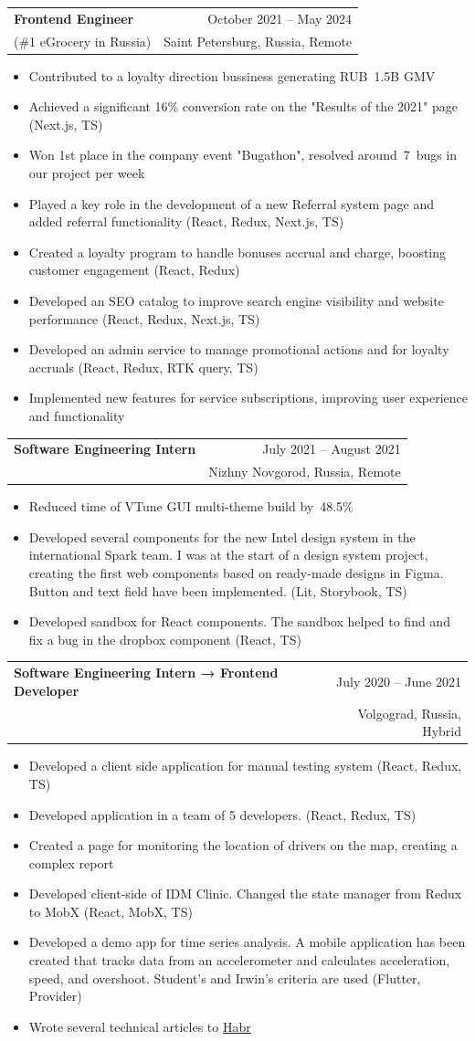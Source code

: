 \documentclass[A4,11pt]{article}
\makeatletter
\newcommand{\CVItem}[1]{
  \item\small{
    {#1 \vspace{-2pt}}
  }
}
\newcommand{\CVSubheading}[4]{
  \vspace{-2pt}\item
    \begin{tabular*}{0.97\textwidth}[t]{l@{\extracolsep{\fill}}r}
      \textbf{#1} & #2 \\
      \small#3 & \small #4 \\
    \end{tabular*}\vspace{-7pt}
}
\newcommand{\lowDescendersUnderline}[1]{%
  \uline{\phantom{#1}}%
  \llap{\contour{white}{#1}}%
}
\newcommand{\link}[2]{
  \href{#1}{\lowDescendersUnderline{#2}}
}
\newcommand{\CVItemListStart}{\begin{itemize}}
\newcommand{\CVItemListEnd}{\end{itemize}\vspace{-5pt}}
\makeatother
\begin{document}
\CVSubheading
{Frontend Engineer}{October 2021 -- May 2024}
{\link{https://sbermarket.ru/}{SberMarket} (\#1 eGrocery in Russia)}{Saint Petersburg, Russia, Remote}
\CVItemListStart
\CVItem{Contributed to a loyalty direction bussiness generating RUB 1.5B GMV}
\CVItem{Achieved a significant 16\% conversion rate on the "Results of the 2021" page (Next.js, TS)}
\CVItem{Won 1st place in the company event "Bugathon", resolved around 7 bugs in our project per week}
\CVItem{Played a key role in the development of a new Referral system page and added referral functionality (React, Redux, Next.js, TS)}
\CVItem{Created a loyalty program to handle bonuses accrual and charge, boosting customer engagement (React, Redux)}
\CVItem{Developed an SEO catalog to improve search engine visibility and website performance (React, Redux, Next.js, TS)}
\CVItem{Developed an admin service to manage promotional actions and for loyalty accruals (React, Redux, RTK query, TS)}
\CVItem{Implemented new features for service subscriptions, improving user experience and functionality}
\CVItemListEnd


\CVSubheading
{Software Engineering Intern}{July 2021 -- August 2021}
{\link{http://summer.russia-students.ru/}{Intel Corporation}}{Nizhny Novgorod, Russia, Remote}
\CVItemListStart
\CVItem{Reduced time of VTune GUI multi-theme build by 48.5\%}
\CVItem{Developed several components for the new Intel design system in the international Spark team. I was at the start of a design system project, creating the first web components based on ready-made designs in Figma. Button and text field have been implemented. (Lit, Storybook, TS)}
\CVItem{Developed sandbox for \link{https://www.intel.com/content/www/us/en/developer/tools/oneapi/vtune-profiler.html}{VTune} React components. The sandbox helped to find and fix a bug in the dropbox component (React, TS)}
\CVItemListEnd

\CVSubheading
{Software Engineering Intern → Frontend Developer}{July 2020 -- June 2021}
{\link{https://www.singularis-lab.com/}{Singularis Lab LLC.}}{Volgograd, Russia, Hybrid}
\CVItemListStart
\CVItem{Developed a client side application for manual testing system (React, Redux, TS)}
\CVItem{Developed \link{https://www.singularis-lab.com/ru/project/volma-portal.html}{Volma Drivers} application in a team of 5 developers. (React, Redux, TS)}
\CVItem{Created a page for monitoring the location of drivers on the map, creating a complex report}
\CVItem{Developed client-side of IDM Clinic. Changed the state manager from Redux to MobX (React, MobX, TS)}
\CVItem{Developed a demo app for time series analysis. A mobile application has been created that tracks data from an accelerometer and calculates acceleration, speed, and overshoot. Student's and Irwin's criteria are used (Flutter, Provider)}
\CVItem{Wrote several technical articles to \href{https://habr.com/ru/users/alexanderyurev/}{\underline{Habr}}}
\CVItemListEnd
\end{document}
